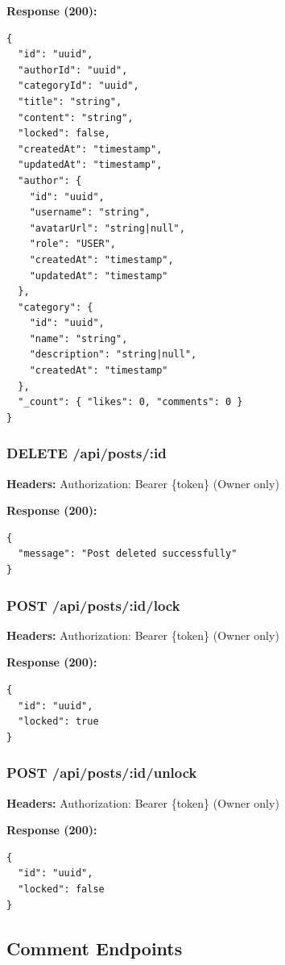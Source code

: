 \documentclass[11pt,a4paper]{article}
\begin{document}
\textbf{Response (200):}
\begin{lstlisting}
{
  "id": "uuid",
  "authorId": "uuid",
  "categoryId": "uuid",
  "title": "string",
  "content": "string",
  "locked": false,
  "createdAt": "timestamp",
  "updatedAt": "timestamp",
  "author": {
    "id": "uuid",
    "username": "string",
    "avatarUrl": "string|null",
    "role": "USER",
    "createdAt": "timestamp",
    "updatedAt": "timestamp"
  },
  "category": {
    "id": "uuid",
    "name": "string",
    "description": "string|null",
    "createdAt": "timestamp"
  },
  "_count": { "likes": 0, "comments": 0 }
}
\end{lstlisting}

\subsubsection{DELETE /api/posts/:id}
\textbf{Headers:} Authorization: Bearer \{token\} (Owner only)

\textbf{Response (200):}
\begin{lstlisting}
{
  "message": "Post deleted successfully"
}
\end{lstlisting}

\subsubsection{POST /api/posts/:id/lock}
\textbf{Headers:} Authorization: Bearer \{token\} (Owner only)

\textbf{Response (200):}
\begin{lstlisting}
{
  "id": "uuid",
  "locked": true
}
\end{lstlisting}

\subsubsection{POST /api/posts/:id/unlock}
\textbf{Headers:} Authorization: Bearer \{token\} (Owner only)

\textbf{Response (200):}
\begin{lstlisting}
{
  "id": "uuid",
  "locked": false
}
\end{lstlisting}

\subsection{Comment Endpoints}
\end{document}
